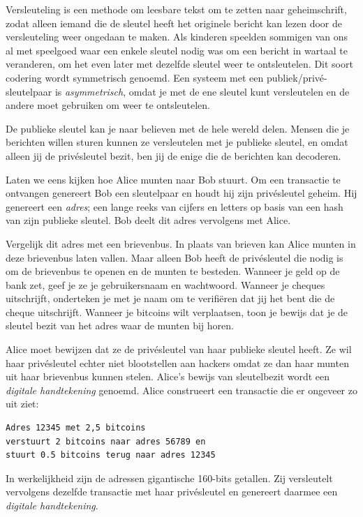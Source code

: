 Versleuteling is een methode om leesbare tekst om te zetten naar geheimschrift, zodat alleen iemand die de sleutel heeft het originele bericht kan lezen door de versleuteling weer ongedaan te maken. Als kinderen speelden sommigen van ons al met speelgoed waar een enkele sleutel nodig was om een bericht in wartaal te veranderen, om het even later met dezelfde sleutel weer te ontsleutelen. Dit soort codering wordt symmetrisch genoemd. Een systeem met een publiek/privé-sleutelpaar is \textit{asymmetrisch}, omdat je met de ene sleutel kunt versleutelen en de andere moet gebruiken om weer te ontsleutelen.

De publieke sleutel kan je naar believen met de hele wereld delen. Mensen die je berichten willen sturen kunnen ze versleutelen met je publieke sleutel, en omdat alleen jij de privésleutel bezit, ben jij de enige die de berichten kan decoderen.

Laten we eens kijken hoe Alice munten naar Bob stuurt. Om een transactie te ontvangen genereert Bob een sleutelpaar en houdt hij zijn privésleutel geheim. Hij genereert een \textit{adres}; een lange reeks van cijfers en letters op basis van een hash van zijn publieke sleutel. Bob deelt dit adres vervolgens met Alice.

Vergelijk dit adres met een brievenbus. In plaats van brieven kan Alice munten in deze brievenbus laten vallen. Maar alleen Bob heeft de privésleutel die nodig is om de brievenbus te openen en de munten te besteden. Wanneer je geld op de bank zet, geef je ze je gebruikersnaam en wachtwoord. Wanneer je cheques uitschrijft, onderteken je met je naam om te verifiëren dat jij het bent die de cheque uitschrijft. Wanneer je bitcoins wilt verplaatsen, toon je bewijs dat je de sleutel bezit van het adres waar de munten bij horen.

Alice moet bewijzen dat ze de privésleutel van haar publieke sleutel heeft. Ze wil haar privésleutel echter niet blootstellen aan hackers omdat ze dan haar munten uit haar brievenbus kunnen stelen. Alice's bewijs van sleutelbezit wordt een \textit{digitale handtekening} genoemd. Alice construeert een transactie die er ongeveer zo uit ziet:

\begin{verbatim}
Adres 12345 met 2,5 bitcoins 
verstuurt 2 bitcoins naar adres 56789 en 
stuurt 0.5 bitcoins terug naar adres 12345
\end{verbatim}

In werkelijkheid zijn de adressen gigantische 160-bits getallen. Zij versleutelt vervolgens dezelfde transactie met haar privésleutel en genereert daarmee een \textit{digitale handtekening}.

